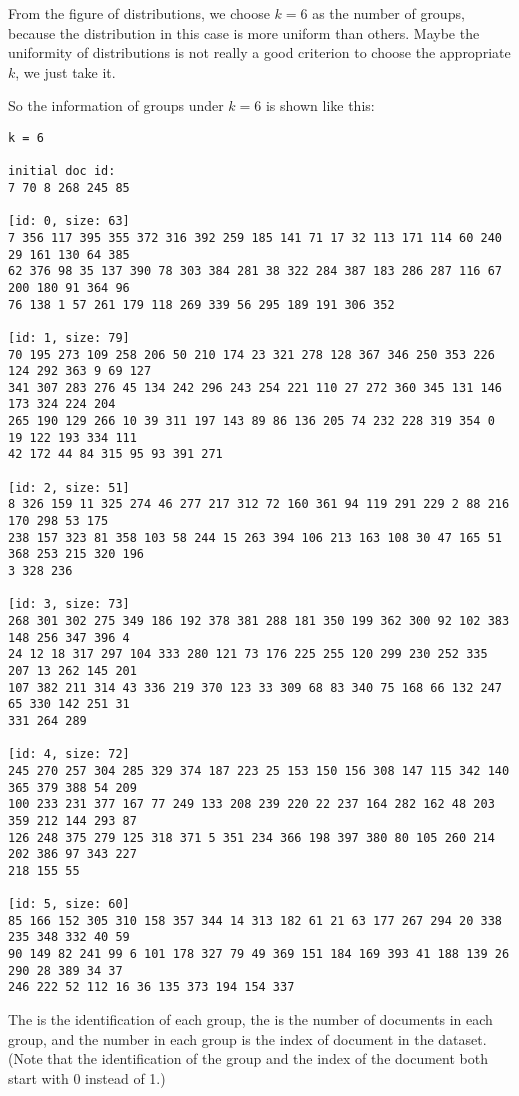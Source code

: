 \documentclass[a4paper, 12pt]{article}
\begin{document}
From the figure of distributions, we choose $k=6$ as the number of groups, because the distribution in this case is more uniform than others. Maybe the uniformity of distributions is not really a good criterion to choose the appropriate $k$, we just take it.

\newpage
So the information of groups under $k=6$ is shown like this:

\begin{lstlisting}[style=plainText,caption={Results of clustering when $k=6$}]
k = 6

initial doc id:
7 70 8 268 245 85

[id: 0, size: 63]
7 356 117 395 355 372 316 392 259 185 141 71 17 32 113 171 114 60 240 29 161 130 64 385
62 376 98 35 137 390 78 303 384 281 38 322 284 387 183 286 287 116 67 200 180 91 364 96
76 138 1 57 261 179 118 269 339 56 295 189 191 306 352

[id: 1, size: 79]
70 195 273 109 258 206 50 210 174 23 321 278 128 367 346 250 353 226 124 292 363 9 69 127
341 307 283 276 45 134 242 296 243 254 221 110 27 272 360 345 131 146 173 324 224 204 
265 190 129 266 10 39 311 197 143 89 86 136 205 74 232 228 319 354 0 19 122 193 334 111 
42 172 44 84 315 95 93 391 271

[id: 2, size: 51]
8 326 159 11 325 274 46 277 217 312 72 160 361 94 119 291 229 2 88 216 170 298 53 175 
238 157 323 81 358 103 58 244 15 263 394 106 213 163 108 30 47 165 51 368 253 215 320 196
3 328 236

[id: 3, size: 73]
268 301 302 275 349 186 192 378 381 288 181 350 199 362 300 92 102 383 148 256 347 396 4
24 12 18 317 297 104 333 280 121 73 176 225 255 120 299 230 252 335 207 13 262 145 201
107 382 211 314 43 336 219 370 123 33 309 68 83 340 75 168 66 132 247 65 330 142 251 31
331 264 289

[id: 4, size: 72]
245 270 257 304 285 329 374 187 223 25 153 150 156 308 147 115 342 140 365 379 388 54 209
100 233 231 377 167 77 249 133 208 239 220 22 237 164 282 162 48 203 359 212 144 293 87
126 248 375 279 125 318 371 5 351 234 366 198 397 380 80 105 260 214 202 386 97 343 227
218 155 55

[id: 5, size: 60]
85 166 152 305 310 158 357 344 14 313 182 61 21 63 177 267 294 20 338 235 348 332 40 59
90 149 82 241 99 6 101 178 327 79 49 369 151 184 169 393 41 188 139 26 290 28 389 34 37
246 222 52 112 16 36 135 373 194 154 337
\end{lstlisting}

The  is the identification of each group, the  is the number of documents in each group, and the number in each group is the index of document in the dataset. (Note that the identification of the group and the index of the document both start with 0 instead of 1.)
\end{document}
